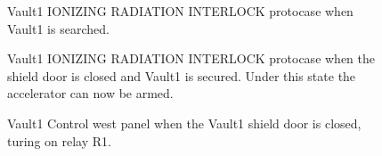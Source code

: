 \documentclass[letterpaper,10pt,english]{sphinxmanual}
\begin{document}
\begin{figure}[htbp]
\centering
\capstart

\noindent{}
\caption{ Vault\sphinxhyphen{}1 IONIZING RADIATION INTERLOCK protocase when Vault\sphinxhyphen{}1 is searched.}\label{\detokenize{testing_documentation/Vault-1_ionizing_radiation:id3}}\end{figure}

\begin{figure}[htbp]
\centering
\capstart

\noindent{}
\caption{ Vault\sphinxhyphen{}1 IONIZING RADIATION INTERLOCK protocase when the shield door is closed and Vault\sphinxhyphen{}1 is secured.
Under this state the accelerator can now be armed.}\label{\detokenize{testing_documentation/Vault-1_ionizing_radiation:id4}}\end{figure}

\begin{figure}[htbp]
\centering
\capstart

\noindent{}
\caption{ Vault\sphinxhyphen{}1 Control west panel when the Vault\sphinxhyphen{}1 shield door is closed, turing on relay R1.}\label{\detokenize{testing_documentation/Vault-1_ionizing_radiation:id5}}\end{figure}
\end{document}
